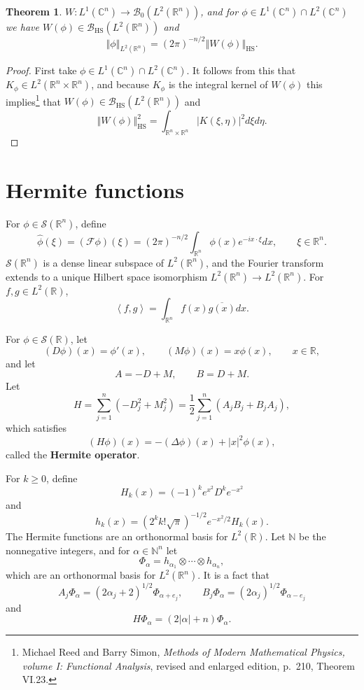 \documentclass{article}
\newcommand{\inner}[2]{\left\langle #1, #2 \right\rangle}
\newcommand{\norm}[1]{\left\Vert #1 \right\Vert}
\newcommand{\HS}[1]{\left\Vert #1 \right\Vert_{\mathrm{HS}}}
\newtheorem{theorem}{Theorem}
\theoremstyle{definition}
\begin{document}
\begin{theorem}
$W:L^1(\mathbb{C}^n) \to \mathscr{B}_0(L^2(\mathbb{R}^n))$, and for $\phi \in L^1(\mathbb{C}^n) \cap L^2(\mathbb{C}^n)$ we have
$W(\phi) \in \mathscr{B}_{\mathrm{HS}}(L^2(\mathbb{R}^n))$ and
\[
\norm{\phi}_{L^2(\mathbb{R}^n)} = (2\pi)^{-n/2} \norm{W(\phi)}_{\mathrm{HS}}.
\]
\end{theorem}
\begin{proof}
First take $\phi \in L^1(\mathbb{C}^n) \cap L^2(\mathbb{C}^n)$. It follows from this that $K_\phi \in L^2(\mathbb{R}^n \times
\mathbb{R}^n)$, and because $K_\phi$ is the integral kernel of $W(\phi)$ this implies\footnote{Michael Reed and Barry Simon, {\em Methods
of Modern Mathematical Physics, volume I: Functional Analysis}, revised and enlarged edition,
p.~210, Theorem VI.23.} that $W(\phi) \in \mathscr{B}_{\mathrm{HS}}(L^2(\mathbb{R}^n))$ and
\[
\HS{W(\phi)}^2 = \int_{\mathbb{R}^n \times \mathbb{R}^n} |K(\xi,\eta)|^2 d\xi d\eta.
\]
\end{proof}






\section{Hermite functions}
For $\phi \in \mathscr{S}(\mathbb{R}^n)$, define
\[
\widehat{\phi}(\xi) =(\mathscr{F} \phi)(\xi) =   (2\pi)^{-n/2} \int_{\mathbb{R}^n} \phi(x) e^{-ix\cdot \xi} dx,\qquad \xi \in \mathbb{R}^n.
\]
$\mathscr{S}(\mathbb{R}^n)$ is a dense linear subspace of $L^2(\mathbb{R}^n)$, and the Fourier transform
 extends  to a unique Hilbert space isomorphism $L^2(\mathbb{R}^n) \to L^2(\mathbb{R}^n)$.
 For $f,g \in L^2(\mathbb{R})$,
 \[
 \inner{f}{g} = \int_{\mathbb{R}^n} f(x) \overline{g(x)} dx.
 \]

For $\phi \in \mathscr{S}(\mathbb{R})$, let
\[
(D\phi)(x) = \phi'(x),\qquad (M\phi)(x)=x\phi(x),\qquad x \in \mathbb{R},
\]
and let
\[
A = -D+M,\qquad B=D+M.
\]
Let
\[
H  = \sum_{j=1}^n (-D_j^2+M_j^2) = \frac{1}{2} \sum_{j=1}^n (A_j B_j + B_j A_j),
\]
which satisfies
\[
(H \phi)(x) = -(\Delta \phi)(x) +|x|^2 \phi(x),
\]
called the \textbf{Hermite operator}.


For $k \geq 0$, define
\[
H_k(x)=(-1)^k e^{x^2} D^k e^{-x^2}
\]
and
\[
h_k(x) = (2^k k! \sqrt{\pi})^{-1/2} e^{-x^2/2}  H_k(x).
\]
The Hermite functions are an orthonormal basis for $L^2(\mathbb{R})$.
Let $\mathbb{N}$ be the nonnegative integers, and for $\alpha \in \mathbb{N}^n$ let
\[
\Phi_\alpha = h_{\alpha_1} \otimes \cdots \otimes h_{\alpha_n},
\]
which are an orthonormal basis for $L^2(\mathbb{R}^n)$. 
It is a fact that
\[
A_j \Phi_\alpha = (2\alpha_j + 2)^{1/2} \Phi_{\alpha+e_j},\qquad B_j \Phi_\alpha
=(2\alpha_j)^{1/2} \Phi_{\alpha-e_j}
\]
and
\[
H\Phi_\alpha = (2|\alpha|+n)\Phi_\alpha.
\]
\end{document}
